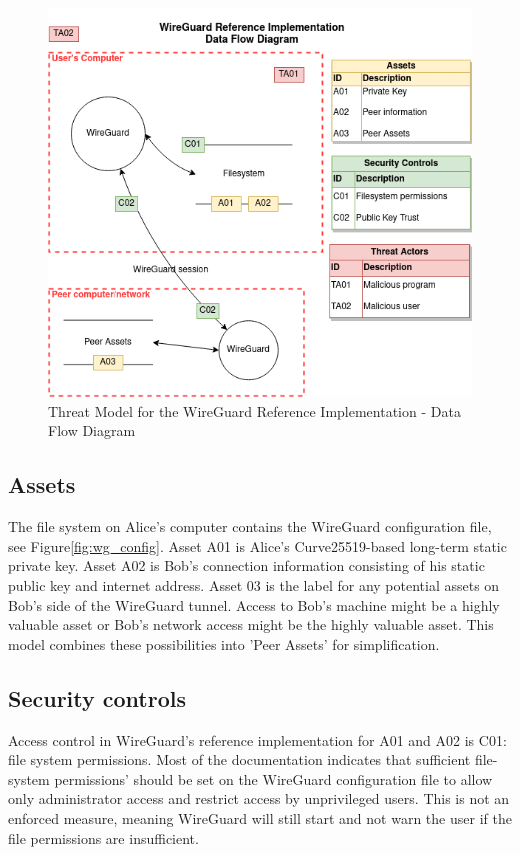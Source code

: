 \documentclass [11pt, proquest] {uwthesis}[2020/02/24]
\begin{document}
\begin{figure}[ht]
\includegraphics[width=14cm]{paper/images/WGH_DFD.png}
\caption{Threat Model for the WireGuard Reference Implementation - Data Flow Diagram}
\label{fig:wg_ref_dfd}
\end{figure}

\subsection{Assets}
The file system on Alice's computer contains the WireGuard configuration file, see Figure\ref{fig:wg_config}. 
Asset A01 is Alice's Curve25519-based long-term static private key. Asset A02 is Bob's connection information consisting of his static public key and internet address. 
Asset 03 is the label for any potential assets on Bob's side of the WireGuard tunnel. Access to Bob's machine might be a highly valuable asset or Bob's network access might be the highly valuable asset. This model combines these possibilities into 'Peer Assets' for simplification.

\subsection{Security controls}
Access control in WireGuard's reference implementation for A01 and A02 is C01: file system permissions. Most of the documentation indicates that sufficient file-system permissions' should be set on the WireGuard configuration file to allow only administrator access and restrict access by unprivileged users. This is not an enforced measure, meaning WireGuard will still start and not warn the user if the file permissions are insufficient. 
\end{document}
